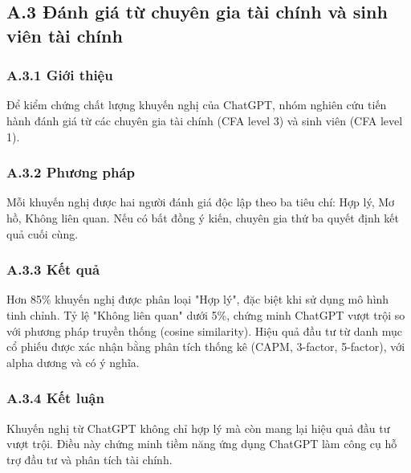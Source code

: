 \documentclass[a4paper,12pt]{article}
\begin{document}
\subsection*{A.3 Đánh giá từ chuyên gia tài chính và sinh viên tài chính}

\subsubsection*{A.3.1 Giới thiệu}
Để kiểm chứng chất lượng khuyến nghị của ChatGPT, nhóm nghiên cứu tiến hành đánh giá từ các chuyên gia tài chính (CFA level 3) và sinh viên (CFA level 1).

\subsubsection*{A.3.2 Phương pháp}
Mỗi khuyến nghị được hai người đánh giá độc lập theo ba tiêu chí: Hợp lý, Mơ hồ, Không liên quan. Nếu có bất đồng ý kiến, chuyên gia thứ ba quyết định kết quả cuối cùng.

\subsubsection*{A.3.3 Kết quả}
Hơn 85\% khuyến nghị được phân loại "Hợp lý", đặc biệt khi sử dụng mô hình tinh chỉnh. Tỷ lệ "Không liên quan" dưới 5\%, chứng minh ChatGPT vượt trội so với phương pháp truyền thống (cosine similarity). Hiệu quả đầu tư từ danh mục cổ phiếu được xác nhận bằng phân tích thống kê (CAPM, 3-factor, 5-factor), với alpha dương và có ý nghĩa.

\subsubsection*{A.3.4 Kết luận}
Khuyến nghị từ ChatGPT không chỉ hợp lý mà còn mang lại hiệu quả đầu tư vượt trội. Điều này chứng minh tiềm năng ứng dụng ChatGPT làm công cụ hỗ trợ đầu tư và phân tích tài chính.
\end{document}

